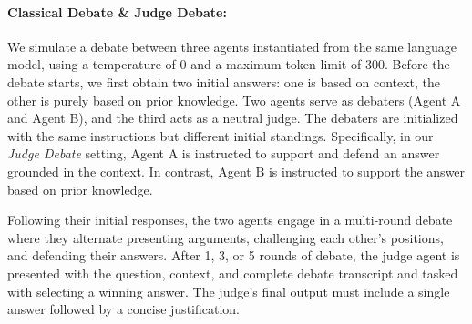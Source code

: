 \documentclass[11pt]{article}
\begin{document}
\paragraph{Classical Debate \& Judge Debate:} We simulate a debate between three agents instantiated from the same language model, using a temperature of 0 and a maximum token limit of 300. Before the debate starts, we first obtain two initial answers: one is based on context, the other is purely based on prior knowledge. Two agents serve as debaters (Agent A and Agent B), and the third acts as a neutral judge. The debaters are initialized with the same instructions but different initial standings. Specifically, in our \emph{Judge Debate} setting, Agent A is instructed to support and defend an answer grounded in the context. In contrast, Agent B is instructed to support the answer based on prior knowledge.

Following their initial responses, the two agents engage in a multi-round debate where they alternate presenting arguments, challenging each other's positions, and defending their answers. After 1, 3, or 5 rounds of debate, the judge agent is presented with the question, context, and complete debate transcript and tasked with selecting a winning answer. The judge's final output must include a single answer followed by a concise justification. 
\end{document}
